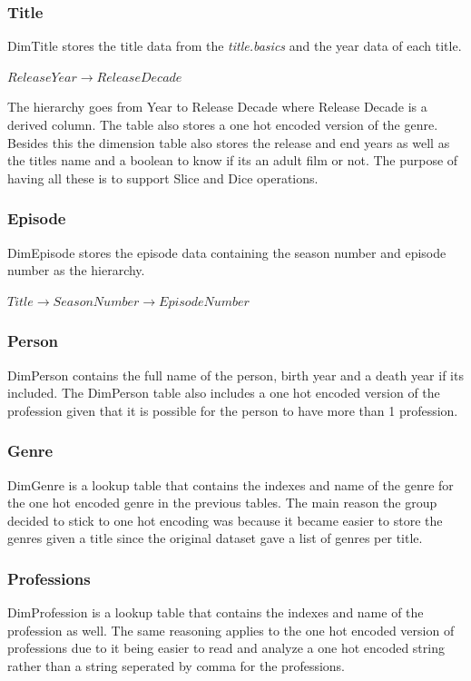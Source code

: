  \subsubsection{Title}
DimTitle stores the title data from the \textit{title.basics} and the year data of each title. 

\begin{center}
$Release Year \rightarrow  Release Decade$
\end{center}

The hierarchy goes from Year to Release Decade where Release Decade is a derived column. The table also stores a one hot encoded version of the genre. Besides this the dimension table also stores the release and end years as well as the titles name and a boolean to know if its an adult film or not. The purpose of having all these is to support Slice and Dice operations.

\subsubsection{Episode}
DimEpisode stores the episode data containing the season number and episode number as the hierarchy. 
\begin{center}
	$Title \rightarrow SeasonNumber \rightarrow EpisodeNumber$
\end{center}


\subsubsection{Person}
DimPerson contains the full name of the person, birth year and a death year if its included. The DimPerson table also includes a one hot encoded version of the profession given that it is possible for the person to have more than 1 profession.

\subsubsection{Genre}
DimGenre is a lookup table that contains the indexes and name of the genre for the one hot encoded genre in the previous tables. The main reason the group decided to stick to one hot encoding was because it became easier to store the genres given a title since the original dataset gave a list of genres per title. 

\subsubsection{Professions}
DimProfession is a lookup table that contains the indexes and name of the profession as well.
The same reasoning applies to the one hot encoded version of professions due to it being easier to read and analyze a one hot encoded string rather than a string seperated by comma for the professions.

